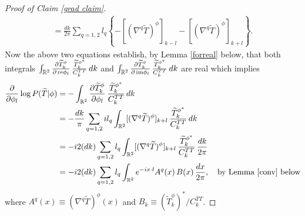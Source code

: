 \documentclass[noinfoline]{imsart}
\newcommand{\re}{\text{\,\rm re}}
\newcommand{\im}{\text{\,\rm im}}
\begin{document}
\begin{proof}[{ Proof of Claim \ref{grad claim}}]
\begin{align}
=
\frac{ dk}{2 \pi} \sum_{q=1,2} l_q\left\{ -[(\nabla^q\widetilde T)^\phi]_{k-l}  -   [(\nabla^q\widetilde T)^\phi]_{k+l}  \right\}.
\end{align}
Now the above two equations establish, by Lemma \ref{forreal} below, that  both integrals $\int_{\Bbb R^2} \frac{\partial \widetilde T_k^\phi}{\partial \re\phi_l} \, \frac{\widetilde T_k^{\phi^*}}{C_k^{TT}}  \,dk$ and $\int_{\Bbb R^2}\frac{\partial \widetilde T_k^\phi}{\partial \im\phi_l} \, \frac{\widetilde T_k^{\phi^*}}{C_k^{TT}} \, dk$ are real
which implies
\begin{align*}
 \frac{\partial}{\partial \phi_l}\log P(\widetilde T| \phi) &= -\int_{\Bbb R^2} \frac{\partial \widetilde T_k^\phi}{\partial \phi_l} \, \frac{\widetilde T_k^{\phi^*}}{C_k^{TT}}  \,dk  \\
 &= -\frac{dk}{ \pi} \sum_{q=1,2} il_q \int_{\Bbb R^2}  [(\nabla^q\widetilde T)^\phi]_{k+l} \, \frac{\widetilde T_k^{\phi^*}}{C_k^{TT}}  \,dk \\
 &= -  i 2 (dk) \sum_{q=1,2} l_q \int_{\Bbb R^2}  [(\nabla^q\widetilde T)^\phi]_{k+l} \, \frac{\widetilde T_k^{\phi^*}}{C_k^{TT}}  \,\frac{dk}{2\pi} \\
 & = -  i 2 (dk) \sum_{q=1,2} l_q \int_{\Bbb R^2} e^{-i x\cdot l} A^q(x) \, B(x)  \,\frac{dx}{2\pi},\quad\text{by Lemma \ref{conv} below}
 \end{align*}
 where $A^q(x) \equiv (\nabla^q\widetilde T)^\phi(x)$ and $B_k\equiv (\widetilde T_k^{\phi})^* / C_k^{TT}$.
\end{proof}
\end{document}
